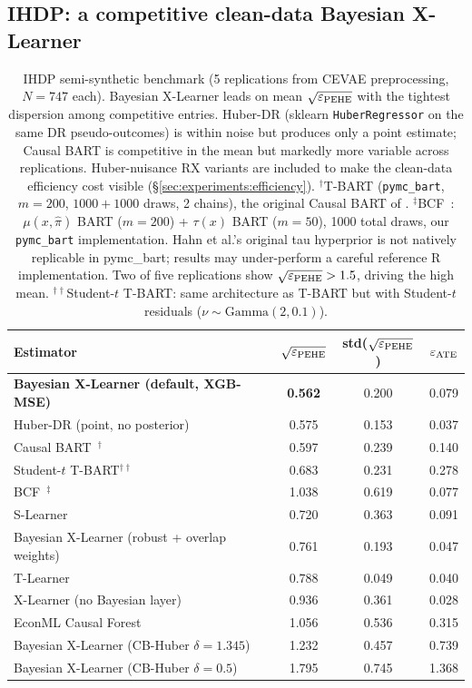 \subsection{IHDP: a competitive clean-data Bayesian X-Learner}
\label{sec:experiments:ihdp}
\begin{table}[!t]
\centering
\small
\begin{tabular}{lccc}
\toprule
Estimator & $\sqrt{\varepsilon_{\mathrm{PEHE}}}$ & std($\sqrt{\varepsilon_{\mathrm{PEHE}}}$) & $\varepsilon_{\mathrm{ATE}}$ \\
\midrule
\textbf{Bayesian X-Learner (default, XGB-MSE)}  & \textbf{0.562} & 0.200 & 0.079 \\
Huber-DR (point, no posterior)                   & 0.575 & 0.153 & 0.037 \\
Causal BART~\citep{hill2011bayesian}$^\dagger$             & 0.597 & 0.239 & 0.140 \\
Student-$t$ T-BART$^{\dagger\dagger}$                       & 0.683 & 0.231 & 0.278 \\
BCF~\citep{hahn2020bcf}$^\ddagger$                          & 1.038 & 0.619 & 0.077 \\
S-Learner                                        & 0.720 & 0.363 & 0.091 \\
Bayesian X-Learner (robust + overlap weights)    & 0.761 & 0.193 & 0.047 \\
T-Learner                                        & 0.788 & 0.049 & 0.040 \\
X-Learner (no Bayesian layer)                    & 0.936 & 0.361 & 0.028 \\
EconML Causal Forest                             & 1.056 & 0.536 & 0.315 \\
\midrule
Bayesian X-Learner (CB-Huber $\delta=1.345$)     & 1.232 & 0.457 & 0.739 \\
Bayesian X-Learner (CB-Huber $\delta=0.5$)       & 1.795 & 0.745 & 1.368 \\
\bottomrule
\end{tabular}
\caption{IHDP semi-synthetic benchmark (5 replications from CEVAE
preprocessing, $N = 747$ each). Bayesian X-Learner leads on mean
$\sqrt{\varepsilon_{\mathrm{PEHE}}}$ with the tightest dispersion among competitive entries.
Huber-DR (sklearn \texttt{HuberRegressor} on the same DR
pseudo-outcomes) is within noise but produces only a point estimate;
Causal BART is competitive in the mean but markedly more variable
across replications. Huber-nuisance RX variants are included to
make the clean-data efficiency cost visible
(\S\ref{sec:experiments:efficiency}).
$^\dagger$T-BART (\texttt{pymc\_bart}, $m = 200$, $1000+1000$ draws,
2 chains), the original Causal BART of
\citet{hill2011bayesian}.
$^\ddagger$BCF~\citep{hahn2020bcf}: $\mu(x, \hat\pi)$ BART ($m=200$)
+ $\tau(x)$ BART ($m=50$), 1000 total draws, our
\texttt{pymc\_bart} implementation. Hahn et al.'s original tau
hyperprior is not natively replicable in pymc\_bart; results may
under-perform a careful reference R implementation. Two of five
replications show $\sqrt{\varepsilon_{\mathrm{PEHE}}} > 1.5$, driving the high mean.
$^{\dagger\dagger}$Student-$t$ T-BART: same architecture as T-BART
but with Student-$t$ residuals ($\nu \sim \mathrm{Gamma}(2,0.1)$).}
\label{tab:ihdp}
\end{table}

